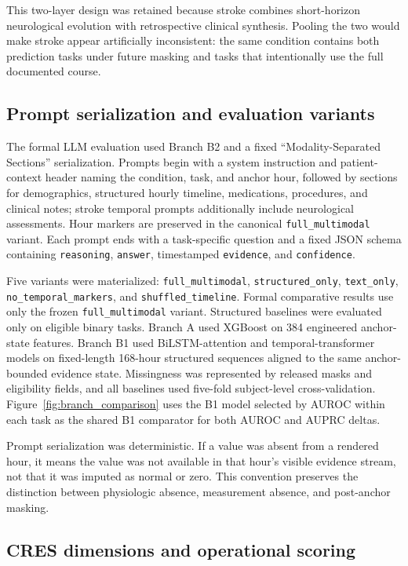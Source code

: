 \documentclass[pdflatex,sn-nature]{sn-jnl}
\begin{document}
This two-layer design was retained because stroke combines short-horizon neurological evolution with retrospective clinical synthesis. Pooling the two would make stroke appear artificially inconsistent: the same condition contains both prediction tasks under future masking and tasks that intentionally use the full documented course.

\subsection{Prompt serialization and evaluation variants}

The formal LLM evaluation used Branch B2 and a fixed ``Modality-Separated Sections'' serialization. Prompts begin with a system instruction and patient-context header naming the condition, task, and anchor hour, followed by sections for demographics, structured hourly timeline, medications, procedures, and clinical notes; stroke temporal prompts additionally include neurological assessments. Hour markers are preserved in the canonical \texttt{full\_multimodal} variant. Each prompt ends with a task-specific question and a fixed JSON schema containing \texttt{reasoning}, \texttt{answer}, timestamped \texttt{evidence}, and \texttt{confidence}.

Five variants were materialized: \texttt{full\_multimodal}, \texttt{structured\_only}, \texttt{text\_only}, \texttt{no\_temporal\_markers}, and \texttt{shuffled\_timeline}. Formal comparative results use only the frozen \texttt{full\_multimodal} variant. Structured baselines were evaluated only on eligible binary tasks. Branch A used XGBoost on 384 engineered anchor-state features. Branch B1 used BiLSTM-attention and temporal-transformer models on fixed-length 168-hour structured sequences aligned to the same anchor-bounded evidence state. Missingness was represented by released masks and eligibility fields, and all baselines used five-fold subject-level cross-validation. Figure~\ref{fig:branch_comparison} uses the B1 model selected by AUROC within each task as the shared B1 comparator for both AUROC and AUPRC deltas.

Prompt serialization was deterministic. If a value was absent from a rendered hour, it means the value was not available in that hour's visible evidence stream, not that it was imputed as normal or zero. This convention preserves the distinction between physiologic absence, measurement absence, and post-anchor masking.

\subsection{CRES dimensions and operational scoring}
\end{document}
